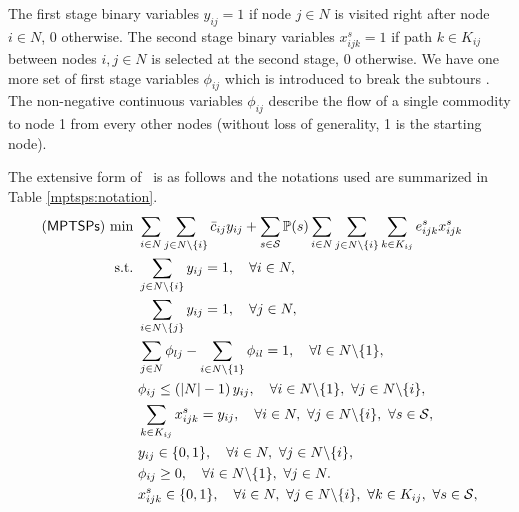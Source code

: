 The first stage binary variables $y_{ij}=1$ if node $j\in N$ is visited right after node $i\in N$, 0 otherwise. The second stage binary variables $x_{ijk}^{s}=1$ if path $k\in K_{ij}$ between nodes $i,j\in N$ is selected at the second stage, 0 otherwise. We have one more set of first stage variables $\phi_{ij}$ which is introduced to break the subtours \cite{journal:LSD1990}. The non-negative continuous variables $\phi_{ij}$ describe the flow of a single commodity to node 1 from every other nodes (without loss of generality, 1 is the starting node). 

The extensive form of \mptsps\ is as follows and the notations used are summarized in Table \ref{mptsps:notation}.
\begin{subequations} \label{mptsps:formulation}
	\begin{align}
	(\mptsps)\ \textrm{min}\ &\sum_{i\in N}\sum_{j\in N\backslash\{i\}}\bar{c}_{ij}y_{ij}+\sum_{s\in \mathcal{S}}\PP(s)\sum_{i\in N}\sum_{j\in N\backslash\{i\}}\sum_{k\in K_{ij}}e_{ijk}^{s}x_{ijk}^{s} \label{mptsps:obj} \\ 
	\textrm{s.t.}\ &\sum_{j\in N\backslash\{i\}}y_{ij}=1,\quad\forall i\in N, \label{mptsps:con1} \\ 
	&\sum_{i\in N\backslash\{j\}}y_{ij}=1,\quad\forall j\in N,\label{mptsps:con2} \\ 
	&\sum_{j\in N}\phi_{lj}-\sum_{i\in N\backslash\{1\}}\phi_{il}=1,\quad\forall l\in N\backslash\{1\}, \label{mptsps:con3}  \\ 
	&\phi_{ij}\le \left(|N|-1\right)y_{ij},\quad\forall i\in N\backslash\{1\},\ \forall j\in N\backslash\{i\}, \label{mptsps:con4} \\ 
	&\sum_{k\in K_{ij}}x_{ijk}^{s}=y_{ij},\quad\forall i\in N,\ \forall j\in N\backslash\{i\},\ \forall s\in \mathcal{S}, \label{mptsps:con5} \\ 
	&y_{ij}\in \{0,1\},\quad \forall i\in N,\ \forall j\in N\backslash\{i\}, \label{mptsps:con6} \\ 
	&\phi_{ij} \ge 0, \quad \forall i\in N\backslash\{1\},\ \forall j\in N. \label{mptsps:con7} \\
	&x_{ijk}^{s}\in\{0,1\},\quad\forall i\in N,\ \forall j\in N\backslash\{i\},\ \forall k\in K_{ij},\ \forall s\in \mathcal{S}, \label{mptsps:con8} 
	\end{align}
\end{subequations}
